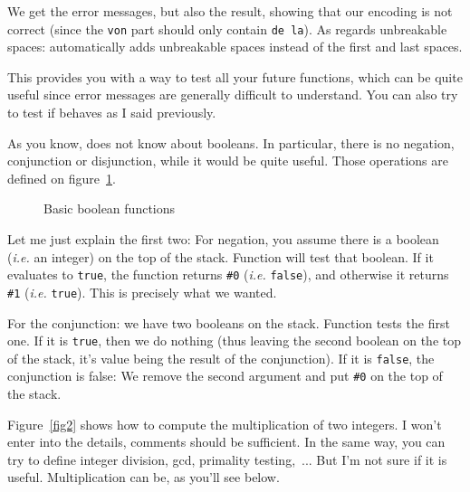 We get the error messages, but also the result, showing that our encoding is
not correct (since the \verb+von+ part should only contain \verb+de la+). 
As regards unbreakable spaces: \bt automatically adds unbreakable spaces
instead of the first and last spaces.

This provides you with a way to test all your future \bt functions, which can
be quite useful since \bt error messages are generally difficult to understand. 
You can also try to test if  behaves as I said previously.




As you know, \bt does not know about booleans. In particular, there is no
negation, conjunction or disjunction, while it would be quite useful.
Those operations are defined  on figure~\ref{fig1}.

\begin{figure}[!htbp]
\begin{myexv}
\end{myexv} %
\caption{Basic boolean functions}\label{fig1}
\end{figure}
Let me just explain the first two: For negation, you assume there is a boolean
(\emph{i.e.} an integer) on the top of the stack. Function  will test that
boolean. If it evaluates to \verb+true+, the function returns \verb+#0+ (\emph{i.e.}
\verb+false+), and otherwise it returns \verb+#1+ (\emph{i.e.} \verb+true+).
This is precisely what we wanted.

For the conjunction: we have two booleans on the stack. Function  tests
the first one. If it is \verb+true+, then we do nothing (thus leaving the
second boolean on the top of the stack, it's value being the result of the
conjunction). If it is \verb+false+, the conjunction is false: We remove the
second argument and put \verb+#0+ on the top of the stack.  


Figure~\ref{fig2} shows how to compute the multiplication of two integers.
I won't enter into the details, comments should be sufficient. In the same
way, you can try to define integer division, gcd, primality testing,~...
But I'm not sure if it is useful. Multiplication can be, as you'll see below.

